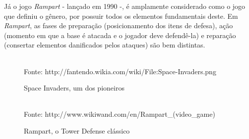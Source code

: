\documentclass[rel_mlp]{iiufrgs}
\newcommand{\fonte}[1]{\\Fonte: {#1}}
\begin{document}
Já o jogo \textit{Rampart} - lançado em 1990 -, é amplamente considerado como o jogo que definiu o gênero, por possuir todos os elementos fundamentais deste. Em \textit{Rampart}, as fases de preparação (posicionamento dos itens de defesa), ação (momento em que a base é atacada e o jogador deve defendê-la) e reparação (consertar elementos danificados pelos ataques) são bem distintas.

\begin{figure}[htb]
    \centering
    \caption{Space Invaders, um dos pioneiros}
    \label{fig:figura1}
    \fonte{http://fantendo.wikia.com/wiki/File:Space-Invaders.png}
\end{figure}

\begin{figure}[htb]
    \centering
    \caption{Rampart, o Tower Defense clássico}
    \label{fig:figura2}
    \fonte{http://www.wikiwand.com/en/Rampart\_(video\_game)}
\end{figure}
\end{document}

